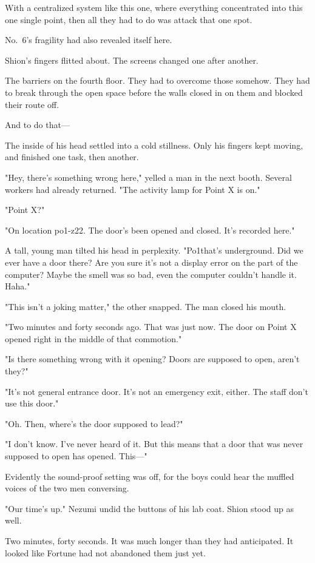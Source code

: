 With a centralized system like this one, where everything concentrated
into this one single point, then all they had to do was attack that one
spot.

No.~6's fragility had also revealed itself here.

Shion's fingers flitted about. The screens changed one after another.

The barriers on the fourth floor. They had to overcome those somehow.
They had to break through the open space before the walls closed in on
them and blocked their route off.

And to do that---

The inside of his head settled into a cold stillness. Only his fingers
kept moving, and finished one task, then another.

"Hey, there's something wrong here," yelled a man in the next booth.
Several workers had already returned. "The activity lamp for Point X is
on."

"Point X?"

"On location po1-z22. The door's been opened and closed. It's recorded
here."

A tall, young man tilted his head in perplexity. "Po1\el that's
underground. Did we ever have a door there? Are you sure it's not a
display error on the part of the computer? Maybe the smell was so bad,
even the computer couldn't handle it. Haha."

"This isn't a joking matter," the other snapped. The man closed his
mouth.

"Two minutes and forty seconds ago. That was just now. The door on Point
X opened right in the middle of that commotion."

"Is there something wrong with it opening? Doors are supposed to open,
aren't they?"

"It's not general entrance door. It's not an emergency exit, either. The
staff don't use this door."

"Oh. Then, where's the door supposed to lead?"

"I don't know. I've never heard of it. But this means that a door that
was never supposed to open has opened. This---"

Evidently the sound-proof setting was off, for the boys could hear the
muffled voices of the two men conversing.

"Our time's up." Nezumi undid the buttons of his lab coat. Shion stood
up as well.

Two minutes, forty seconds. It was much longer than they had
anticipated. It looked like Fortune had not abandoned them just yet.

